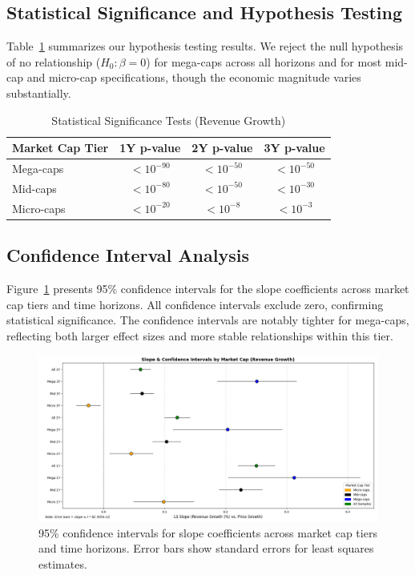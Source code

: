 \documentclass[11pt]{article}
\begin{document}
\subsection{Statistical Significance and Hypothesis Testing}

Table~\ref{tab:hypothesis-tests} summarizes our hypothesis testing results. We reject the null hypothesis of no relationship ($H_0: \beta = 0$) for mega-caps across all horizons and for most mid-cap and micro-cap specifications, though the economic magnitude varies substantially.

\begin{table}[!htbp]
\small
\centering
\caption{Statistical Significance Tests (Revenue Growth)}
\label{tab:hypothesis-tests}
\begin{tabular}{lccc}
\toprule
Market Cap Tier & 1Y p-value & 2Y p-value & 3Y p-value \\
\midrule
Mega-caps & $< 10^{-90}$ & $< 10^{-50}$ & $< 10^{-50}$ \\
Mid-caps  & $< 10^{-80}$ & $< 10^{-50}$ & $< 10^{-30}$ \\
Micro-caps & $< 10^{-20}$ & $< 10^{-8}$ & $< 10^{-3}$ \\
\bottomrule
\end{tabular}
\end{table}

\FloatBarrier

\subsection{Confidence Interval Analysis}

Figure~\ref{fig:confidence-intervals} presents 95\% confidence intervals for the slope coefficients across market cap tiers and time horizons. All confidence intervals exclude zero, confirming statistical significance. The confidence intervals are notably tighter for mega-caps, reflecting both larger effect sizes and more stable relationships within this tier.

\begin{figure}[!htbp]
\centering
\includegraphics[width=\textwidth]{images/all_horizons_confidence_intervals.png}
\caption{95\% confidence intervals for slope coefficients across market cap tiers and time horizons. Error bars show standard errors for least squares estimates.}
\label{fig:confidence-intervals}
\end{figure}
\end{document}
